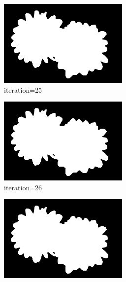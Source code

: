 \documentclass{article}
\begin{document}
\begin{figure}[t]
\begin{subfigure}[t]{0.19\textwidth}
\includegraphics[width=\textwidth]{./images/marginals_iter_25.png}
\vspace{-0.6cm}
\caption{iteration=25}
\end{subfigure}
\begin{subfigure}[t]{0.19\textwidth}
\centering
\includegraphics[width=\textwidth]{./images/marginals_iter_26.png}
\vspace{-0.6cm}
\caption{iteration=26}
\end{subfigure}
\begin{subfigure}[t]{0.19\textwidth}
\centering
\includegraphics[width=\textwidth]{./images/marginals_iter_27.png}

\end{subfigure}
\end{figure}
\end{document}
